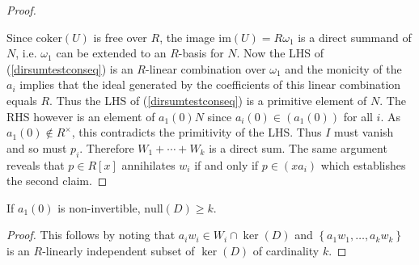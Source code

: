 \documentclass[ALCO, Unicode]{cedram}
\begin{document}
\begin{proof}
\begin{center}
\end{center}        
Since $  \mathrm{coker}(U) $ is free over $ R $, the image $ \mathrm{im}(U) = R \omega_{1}    $ is a direct summand of $ N $, i.e. $ \omega_{1} $ can be extended to an $R$-basis for $ N $. Now the LHS of (\ref{dirsumtestconseq}) is an $ R$-linear combination over $  \omega_{1} $ and the monicity of the $ a_{i} $ implies that the ideal generated by the coefficients of this linear combination equals $ R $. 
Thus the LHS of  (\ref{dirsumtestconseq}) is  a primitive element of $ N $.
The RHS however is an element of $ a_1(0) N $ since $ a_{i}(0) \in ( a_{1}(0)) $ for all $ i $. As  $ a_{1}(0)   \notin R^{\times} $, this contradicts the primitivity of the LHS.  Thus $ I $ must vanish and so must    $ p_{i} $.  Therefore $ W_{1}  + \cdots  +  W_{k }    $ is a direct sum. The same argument reveals that $ p \in R[x] $ annihilates $ w_{i}  $ if and only if $ p   \in (x a_{i} )$ which establishes the second claim. 
\end{proof}   


\begin{corollary} \label{nullityofD}     If $ a_{1}(0) $ is non-invertible, $ \mathrm{null}(D) \geq k   $.    
\end{corollary}  
\begin{proof} This follows by noting that  $  a_{i}w_{i} \in W_{i} \cap \ker(D) $ and  $  \left \{ a_{1}w_{1} , \ldots, a_{k} w_{k} \right \} $ is an $R$-linearly independent subset of $ \ker (D) $ of  cardinality $ k  $. 
\end{proof}  
\end{document}
